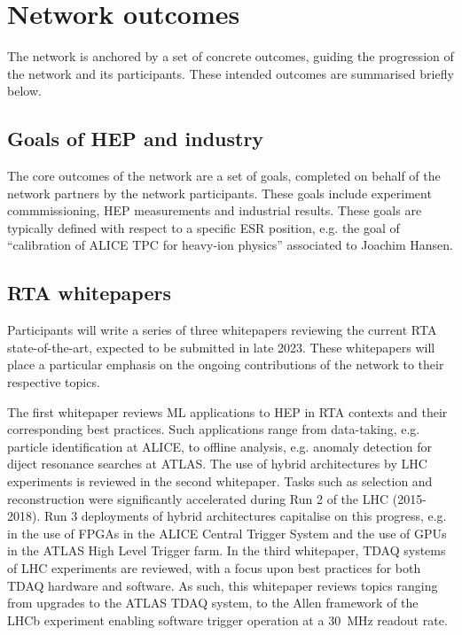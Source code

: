 \section{Network outcomes}
\label{outcomes}
The network is anchored by a set of concrete outcomes, guiding the progression of the network and its participants. These intended outcomes are summarised briefly below.

\subsection{Goals of HEP and industry}
\label{goals}
The core outcomes of the network are a set of goals, completed on behalf of the network partners by the network participants.  These goals include experiment commmissioning, HEP measurements and industrial results. These goals are typically defined with respect to a specific ESR position, e.g. the goal of ``calibration of ALICE TPC for heavy-ion physics'' associated to Joachim Hansen.

\subsection{RTA whitepapers}
\label{whitepapers}
Participants will write a series of three whitepapers reviewing the current RTA state-of-the-art, expected to be submitted in late 2023. These whitepapers will place a particular emphasis on the ongoing contributions of the network to their respective topics. \par

The first whitepaper reviews ML applications to HEP in RTA contexts and their corresponding best practices. Such applications range from data-taking, e.g. particle identification at ALICE, to offline analysis, e.g. anomaly detection for diject resonance searches at ATLAS. \cite{ALICE-PID, ATLAS-dijet} The use of hybrid architectures by LHC experiments is reviewed in the second whitepaper. Tasks such as selection and reconstruction were significantly accelerated during Run 2 of the LHC (2015-2018). Run 3 deployments of hybrid architectures capitalise on this progress, e.g. in the use of FPGAs in the ALICE Central Trigger System and the use of GPUs in the ATLAS High Level Trigger farm. \cite{ALICE-CTS, CMS-HLT-farm} In the third whitepaper, TDAQ systems of LHC experiments are reviewed, with a focus upon best practices for both TDAQ hardware and software. As such, this whitepaper reviews topics ranging from upgrades to the ATLAS TDAQ system, to the Allen framework of the LHCb experiment enabling software trigger operation at a 30~MHz readout rate. \cite{ATLAS-TDAQ, LHCb-Allen}


